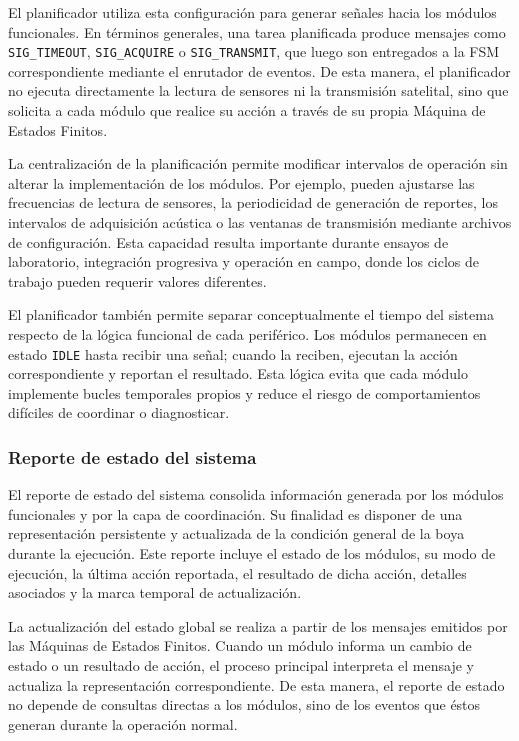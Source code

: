 El planificador utiliza esta configuración para generar señales hacia los módulos funcionales. En términos generales, una tarea planificada produce mensajes como \texttt{SIG\_TIMEOUT}, \texttt{SIG\_ACQUIRE} o \texttt{SIG\_TRANSMIT}, que luego son entregados a la FSM correspondiente mediante el enrutador de eventos. De esta manera, el planificador no ejecuta directamente la lectura de sensores ni la transmisión satelital, sino que solicita a cada módulo que realice su acción a través de su propia Máquina de Estados Finitos.

La centralización de la planificación permite modificar intervalos de operación sin alterar la implementación de los módulos. Por ejemplo, pueden ajustarse las frecuencias de lectura de sensores, la periodicidad de generación de reportes, los intervalos de adquisición acústica o las ventanas de transmisión mediante archivos de configuración. Esta capacidad resulta importante durante ensayos de laboratorio, integración progresiva y operación en campo, donde los ciclos de trabajo pueden requerir valores diferentes.

El planificador también permite separar conceptualmente el tiempo del sistema respecto de la lógica funcional de cada periférico. Los módulos permanecen en estado \texttt{IDLE} hasta recibir una señal; cuando la reciben, ejecutan la acción correspondiente y reportan el resultado. Esta lógica evita que cada módulo implemente bucles temporales propios y reduce el riesgo de comportamientos difíciles de coordinar o diagnosticar.

\vspace{10px}

\subsubsection{Reporte de estado del sistema}
\label{subsubsec:reporte_estado_sistema}

El reporte de estado del sistema consolida información generada por los módulos funcionales y por la capa de coordinación. Su finalidad es disponer de una representación persistente y actualizada de la condición general de la boya durante la ejecución. Este reporte incluye el estado de los módulos, su modo de ejecución, la última acción reportada, el resultado de dicha acción, detalles asociados y la marca temporal de actualización.

La actualización del estado global se realiza a partir de los mensajes emitidos por las Máquinas de Estados Finitos. Cuando un módulo informa un cambio de estado o un resultado de acción, el proceso principal interpreta el mensaje y actualiza la representación correspondiente. De esta manera, el reporte de estado no depende de consultas directas a los módulos, sino de los eventos que éstos generan durante la operación normal.

